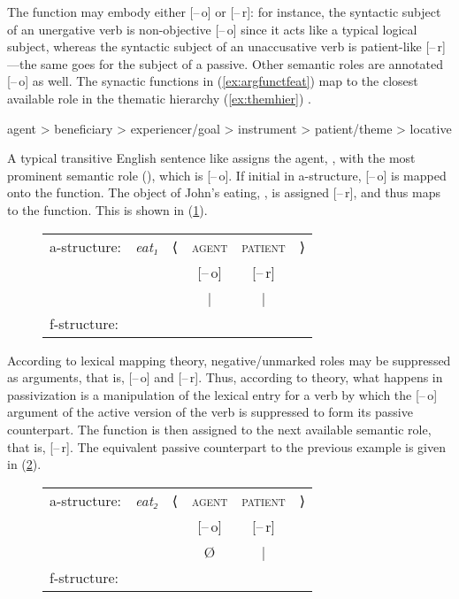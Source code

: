 The \Subj{} function may embody either [–\,o] or [–\,r]: for instance, the
syntactic subject of an unergative verb is non-objective [–\,o] since it acts
like a typical logical subject, whereas the syntactic subject of an
unaccusative verb is patient-like \mbox{[–\,r]}---the same goes for the subject
of a passive. Other semantic roles are annotated [–\,o] as well. The synactic
functions in (\ref{ex:argfunctfeat}) map to the closest available role in the
thematic hierarchy (\ref{ex:themhier}) \citep[329]{bresnan2016}.

\ex\label{ex:themhier}%
	agent > beneficiary > experiencer/goal > instrument > patient/theme >
	locative
\xe

A typical transitive English sentence like  assigns
the agent, , with the most prominent semantic role (\thetaroof), which
is [–\,o]. If initial in a-structure, [–\,o] is mapped onto the \Subj{}
function. The object of John's eating, , is assigned [–\,r], and
thus maps to the \Obj{} function. This is shown in (\ref{ex:engactive}).

\begin{figure}[ht]
\ex\label{ex:engactive}
\begin{tabular}[t]{l >{\itshape}l l c c r}
a-structure:
	& eat₁
	& ⟨
	& \textsc{agent}
	& \textsc{patient}
	& ⟩
	\\
%
	& %
	& %
	& [–\,o]
	& [–\,r]
	& %
	\\

%
	& %
	& %
	& |
	& |
	& %
	\\

f-structure:
	& %
	& %
	& \Subj
	& \Obj
	& %
	\\
\end{tabular}
\xe
\end{figure}

According to lexical mapping theory, negative/unmarked roles may be suppressed
as arguments, that is, [–\,o] and [–\,r]. Thus, according to \Lfg{} theory,
what happens in passivization is a manipulation of the lexical entry for a verb
by which the [–\,o] argument of the active version of the verb is suppressed to
form its passive counterpart. The \Subj{} function is then assigned to the next
available semantic role, that is, [–\,r]. The equivalent passive counterpart to
the previous example is given in (\ref{ex:engpassive}).

\begin{figure}[ht]
\ex\label{ex:engpassive}
\begin{tabular}[t]{l >{\itshape}l l c c r}
a-structure:
	& eat₂
	& ⟨
	& \textsc{agent}
	& \textsc{patient}
	& ⟩
	\\
%
	& %
	& %
	& [–\,o]
	& [–\,r]
	& %
	\\

%
	& %
	& %
	& Ø
	& |
	& %
	\\

f-structure:
	& %
	& %
	& %
	& \Subj
	& %
	\\
\end{tabular}
\xe
\end{figure}

